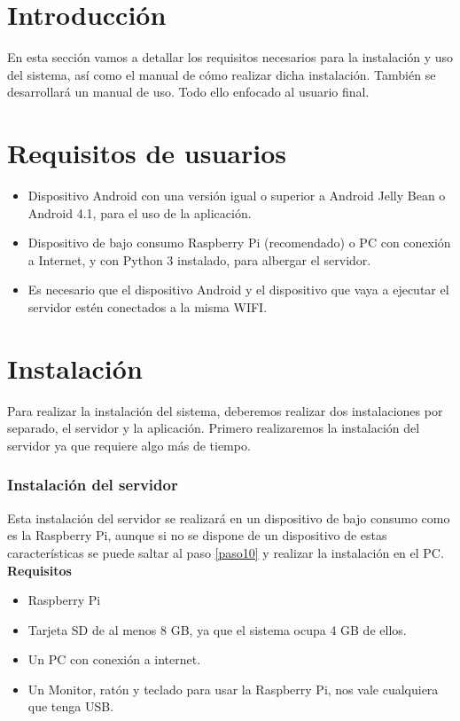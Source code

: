 
\section{Introducción}

En esta sección vamos a detallar los requisitos necesarios para la instalación y uso del sistema, así como el manual de cómo realizar dicha instalación. También se desarrollará un manual de uso. Todo ello enfocado al usuario final.

\section{Requisitos de usuarios}

\begin{itemize}
\item
	Dispositivo Android con una versión igual o superior a Android Jelly Bean o Android 4.1, para el uso de la aplicación.
\item
	Dispositivo de bajo consumo Raspberry Pi (recomendado) o PC con conexión a Internet, y con Python 3 instalado, para albergar el servidor.
\item
	Es necesario que el dispositivo Android y el dispositivo que vaya a ejecutar el servidor estén conectados a la misma WIFI.
\end{itemize}

\section{Instalación}

Para realizar la instalación del sistema, deberemos realizar dos instalaciones por separado, el servidor y la aplicación. Primero realizaremos la instalación del servidor ya que requiere algo más de tiempo.

\subsubsection{Instalación del servidor}

Esta instalación del servidor se realizará en un dispositivo de bajo consumo como es la Raspberry Pi, aunque si no se dispone de un dispositivo de estas características se puede saltar al paso \ref{paso10} y realizar la instalación en el PC.\\

\textbf{Requisitos}

\begin{itemize}
\item
	Raspberry Pi
\item
	Tarjeta SD de al menos 8 GB, ya que el sistema ocupa 4 GB de ellos.
\item
	Un PC con conexión a internet.
\item \label{piperifs}
	Un Monitor, ratón y teclado para usar la Raspberry Pi, nos vale cualquiera que tenga USB.
\end{itemize}

